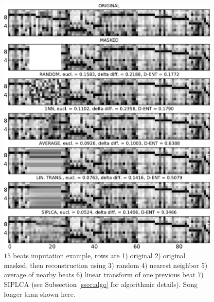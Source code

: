 \documentclass{article}
\begin{document}
\begin{figure}[t]
\begin{center}
\includegraphics[width=.99\columnwidth]{basic2}
\end{center}
\caption{$15$ beats imputation example, rows are 1) original 2) original masked,
then reconstruction using 3) random 4) nearest neighbor 5) average of nearby beats
6) linear transform of one previous beat 7) SIPLCA (see Subsection \ref{ssec:algo}
for algorithmic details). Song longer than shown here.
\label{fig:basic}}
\end{figure}



\end{document}
